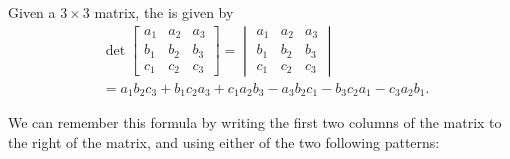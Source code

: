 \documentclass{ximera}
\begin{document}
\begin{definition}
  Given a $3\times 3$ matrix, the  is given by
  \begin{align*}
  &\det\begin{bmatrix}
  a_1 &  a_2 & a_3 \\
  b_1 &  b_2 & b_3 \\
  c_1 &  c_2 & c_3
  \end{bmatrix}
  =
  \begin{vmatrix}
    a_1 &  a_2 & a_3 \\
    b_1 &  b_2 & b_3 \\
    c_1 &  c_2 & c_3
  \end{vmatrix}\\
  &= a_1b_2c_3+b_1c_2a_3+c_1a_2b_3-a_3b_2c_1-b_3c_2a_1-c_3a_2b_1.
  \end{align*}
\end{definition}
We can remember this formula by writing the first two columns of the
matrix to the right of the matrix, and using either of the two
following patterns:
\end{document}
